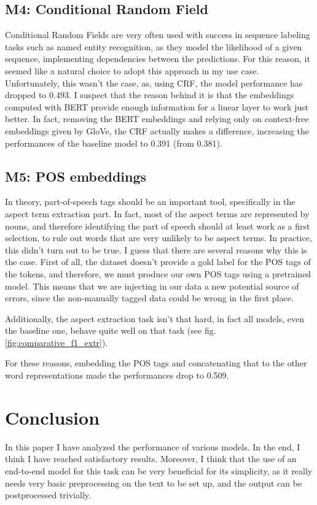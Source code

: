 \documentclass[11pt,a4paper]{article}
\begin{document}
	\subsection{M4: Conditional Random Field}
	Conditional Random Fields \citep{lafferty2001conditional} are very often used
	with success in sequence labeling tasks such as named entity recognition, as
	they model the likelihood of a given sequence, implementing dependencies between
	the predictions.  For this reason, it seemed like a natural choice to adopt this
	approach in my use case. Unfortunately, this wasn't the case, as, using CRF, the
	model performance has dropped to 0.493. I suspect that the reason behind it is
	that the embeddings computed with BERT provide enough information for a linear
	layer to work just better. In fact, removing the BERT embeddings and relying
	only on context-free embeddings given by GloVe, the CRF actually makes a
	difference, increasing the performances of the baseline model to 0.391 (from
	0.381).
	
	\subsection{M5: POS embeddings}
	In theory, part-of-speech tags should be an important tool, specifically in the
	aspect term extraction part. In fact, most of the aspect terms are represented
	by nouns, and therefore identifying the part of speech should at least work as a
	first selection, to rule out words that are very unlikely to be aspect terms. In
	practice, this didn't turn out to be true. I guess that there are several
	reasons why this is the case. First of all, the dataset doesn't provide a gold
	label for the POS tags of the tokens, and therefore, we must produce our own POS
	tags using a pretrained model. This means that we are injecting in our data a
	new potential source of errors, since the non-manually tagged data could be
	wrong in the first place.
	
	Additionally, the aspect extraction task isn't that hard, in fact all models,
	even the baseline one, behave quite well on that task (see fig.
	\ref{fig:comparative_f1_extr}).
	
	For these reasons, embedding the POS tags and concatenating that to the other
	word representations made the performances drop to 0.509.
	
	\section{Conclusion}
	In this paper I have analyzed the performance of various models. In the end, I think I have reached satisfactory results. Moreover, I
	think that the use of an end-to-end model for this task can be very beneficial
	for its simplicity, as it really needs very basic preprocessing on the text to
	be set up, and the output can be postprocessed trivially.
	
\end{document}
